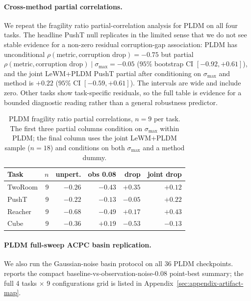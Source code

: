 \documentclass[10pt]{article}
\newcommand{\stdmax}{\ensuremath{\sigma_{\max}}}
\newcommand{\fragility}{fragility ratio}
\begin{document}
\paragraph{Cross-method partial correlations.} We repeat the \fragility{} partial-correlation analysis for PLDM on all four tasks. The headline PushT null replicates in the limited sense that we do not see stable evidence for a non-zero residual corruption-gap association: PLDM has unconditional $\rho(\text{metric}, \text{corruption drop}) = -0.75$ but partial $\rho(\text{metric}, \text{corruption drop}) \mid \stdmax{} = -0.05$ ($95\%$ bootstrap CI $[-0.92, +0.61]$), and the joint LeWM+PLDM PushT partial after conditioning on \stdmax{} and method is $+0.22$ ($95\%$ CI $[-0.59, +0.61]$). The intervals are wide and include zero. Other tasks show task-specific residuals, so the full table is evidence for a bounded diagnostic reading rather than a general robustness predictor.

\begin{table}[H]
\centering
\caption{PLDM \fragility{} partial correlations, $n = 9$ per task. The first three partial columns condition on \stdmax{} within PLDM; the final column uses the joint LeWM+PLDM sample ($n = 18$) and conditions on both \stdmax{} and a method dummy.}
\label{tab:pldm-partial-corr}
\small
\begin{tabular}{lrrrrr}
\toprule
Task & $n$ & unpert. & obs 0.08 & drop & joint drop \\
\midrule
TwoRoom & 9 & $-0.26$ & $-0.43$ & $+0.35$ & $+0.12$ \\
PushT & 9 & $-0.22$ & $-0.13$ & $-0.05$ & $+0.22$ \\
Reacher & 9 & $-0.68$ & $-0.49$ & $+0.17$ & $+0.43$ \\
Cube & 9 & $-0.36$ & $+0.19$ & $-0.53$ & $-0.13$ \\
\bottomrule
\end{tabular}%
\end{table}

\paragraph{PLDM full-sweep ACPC basin replication.} We also run the Gaussian-noise basin protocol on all 36 PLDM checkpoints.  reports the compact baseline-vs-observation-noise-0.08 point-best summary; the full 4 tasks $\times$ 9 configurations grid is listed in Appendix~\ref{sec:appendix-artifact-map}.
\end{document}
